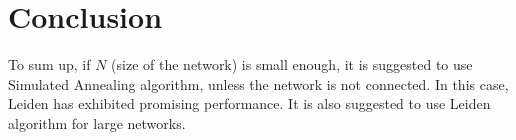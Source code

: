 \documentclass[11pt,a4paper]{article}
\begin{document}
\section{Conclusion}

To sum up, if $N$ (size of the network) is small enough, it is suggested to use Simulated Annealing algorithm, unless the network is not connected. In this case, Leiden has exhibited promising performance. It is also suggested to use Leiden algorithm for large networks.


\end{document}
